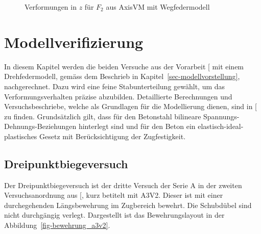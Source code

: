\documentclass[
  10pt,
  letterpaper,
]{scrreprt}
\begin{document}
\begin{figure}[H]


\caption{\label{fig-f2-wegfeder}Verformungen in \(z\) für \(F_2\) aus
AxisVM mit Wegfedermodell}

\end{figure}%


\chapter{Modellverifizierung}\label{modellverifizierung}

In diesem Kapitel werden die beiden Versuche aus der Vorarbeit
{[}\citeproc{ref-gitz_ansatze_2024}{1}{]} mit einem Drehfedermodell,
gemäss dem Beschrieb in Kapitel~\ref{sec-modellvorstellung},
nachgerechnet. Dazu wird eine feine Stabunterteilung gewählt, um das
Verformungsverhalten präzise abzubilden. Detaillierte Berechnungen und
Versuchsbeschriebe, welche als Grundlagen für die Modellierung dienen,
sind in {[}\citeproc{ref-gitz_ansatze_2024}{1}{]} zu finden.
Grundsätzlich gilt, dass für den Betonstahl bilineare
Spannungs-Dehnungs-Beziehungen hinterlegt sind und für den Beton ein
elastisch-ideal-plastisches Gesetz mit Berücksichtigung der
Zugfestigkeit.

\section{Dreipunktbiegeversuch}\label{dreipunktbiegeversuch}

Der Dreipunktbiegeversuch ist der dritte Versuch der Serie A in der
zweiten Versuchsanordnung aus
{[}\citeproc{ref-jager_versuche_2006}{2}{]}, kurz betitelt mit A3V2.
Dieser ist mit einer durchegehenden Längsbewehrung im Zugbereich
bewehrt. Die Schubdübel sind nicht durchgängig verlegt. Dargestellt ist
das Bewehrungslayout in der Abbildung~\ref{fig-bewehrung_a3v2}.
\end{document}
